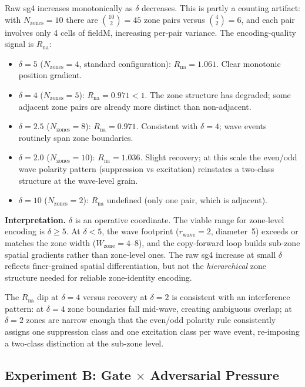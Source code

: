 \documentclass[11pt,a4paper]{article}
\begin{document}
Raw sg4 increases monotonically as $\delta$ decreases.  This is partly a
counting artifact: with $N_\text{zones}=10$ there are $\binom{10}{2}=45$
zone pairs versus $\binom{4}{2}=6$, and each pair involves only 4 cells of
fieldM, increasing per-pair variance.  The encoding-quality signal is
$R_\text{na}$:

\begin{itemize}
  \item $\delta = 5$ ($N_\text{zones}=4$, standard configuration):
        $R_\text{na} = 1.061$.  Clear monotonic position gradient.
  \item $\delta = 4$ ($N_\text{zones}=5$):
        $R_\text{na} = 0.971 < 1$.  The zone structure has degraded;
        some adjacent zone pairs are already more distinct than non-adjacent.
  \item $\delta = 2.5$ ($N_\text{zones}=8$):
        $R_\text{na} = 0.971$.  Consistent with $\delta=4$; wave events
        routinely span zone boundaries.
  \item $\delta = 2.0$ ($N_\text{zones}=10$):
        $R_\text{na} = 1.036$.  Slight recovery; at this scale the even/odd
        wave polarity pattern (suppression vs excitation) reinstates a
        two-class structure at the wave-level grain.
  \item $\delta = 10$ ($N_\text{zones}=2$):
        $R_\text{na}$ undefined (only one pair, which is adjacent).
\end{itemize}

\textbf{Interpretation.}  $\delta$ is an operative coordinate.  The viable
range for zone-level encoding is $\delta \geq 5$.  At $\delta < 5$, the wave
footprint ($r_\text{wave}=2$, diameter~5) exceeds or matches the zone width
($W_\text{zone}=4$--$8$), and the copy-forward loop builds sub-zone spatial
gradients rather than zone-level ones.  The raw sg4 increase at small $\delta$
reflects finer-grained spatial differentiation, but not the
\emph{hierarchical} zone structure needed for reliable zone-identity encoding.

The $R_\text{na}$ dip at $\delta=4$ versus recovery at $\delta=2$ is consistent
with an interference pattern: at $\delta=4$ zone boundaries fall mid-wave,
creating ambiguous overlap; at $\delta=2$ zones are narrow enough that the
even/odd polarity rule consistently assigns one suppression class and one
excitation class per wave event, re-imposing a two-class distinction at the
sub-zone level.

\subsection{Experiment B: Gate $\times$ Adversarial Pressure}
\end{document}
